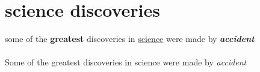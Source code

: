 \documentclass{article}
\begin{document}
	
	\section{science discoveries}
	some of the \textbf{greatest} discoveries in \underline{science} were made by \textbf{\textit{accident}}
	
	\paragraph{}
	Some of the greatest discoveries in science were made by \emph{accident}
	
\end{document}

